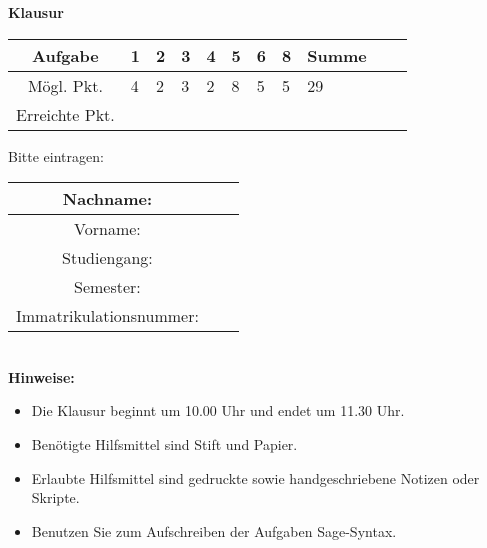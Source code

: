 \begin{center}
\Huge \textbf{Klausur}
\end{center}
\bigskip\bigskip\bigskip
\Large
\begin{center}
\begin{tabular}{|Sl||p{0.5cm}|p{0.5cm}|p{0.5cm}|p{0.5cm}|p{0.5cm}|p{0.5cm}|p{0.5cm}||Sc|}
\hline
Aufgabe & \textbf{1} & \textbf{2} & \textbf{3} & \textbf{4} & \textbf{5} & \textbf{6} & \textbf{8} & \textbf{Summe}\\
\hline
Mögl. Pkt. &  4  & 2  & 3  & 2  & 8  & 5  & 5  &  29  \\
\hline
Erreichte Pkt. &    &   &   &   &   &   &     &    \\
\hline
\end{tabular}
\end{center}

\bigskip\bigskip\bigskip
Bitte eintragen:\\
\begin{center}
\begin{tabular}{|Sl|p{8cm}|}
\hline
Nachname: & \\
\hline
Vorname: & \\
\hline
Studiengang: & \\
\hline 
Semester: & \\
\hline 
Immatrikulationsnummer: & \\
\hline
\end{tabular}\\[1cm]
\textbf{Hinweise:}
\begin{itemize}
\item Die Klausur beginnt um 10.00 Uhr und endet um 11.30 Uhr.
\item Ben\"otigte Hilfsmittel sind Stift und Papier.
\item Erlaubte Hilfsmittel sind gedruckte sowie handgeschriebene Notizen oder Skripte. 
\item Benutzen Sie zum Aufschreiben der Aufgaben Sage-Syntax.
\end{itemize}
\end{center}

\newpage
\normalsize
